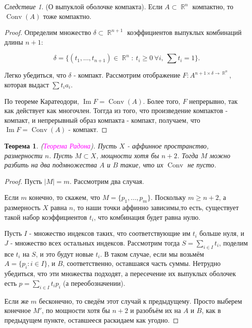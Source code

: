 \documentclass[a4paper,100pt]{article}
\theoremstyle{indented}
\newtheorem{theorem}{Теорема}
\theoremstyle{definition}
\theoremstyle{remark}
\newtheorem{cons}{Следствие}
\DeclareMathOperator{\ra}{\rightarrow}
\DeclareMathOperator{\Imf}{Im}
\DeclareMathOperator{\Conv}{Conv}
\DeclareMathOperator{\RR}{\mathbb{R}}
\begin{document}
\begin{cons}
    (О выпуклой оболочке компакта). Если $A\subset \RR^n$ компактно, то $\Conv(A)$ тоже компактно.
\end{cons}

\begin{proof}
    Определим множество $\delta \subset \RR^{n+1}$ коэффициентов выпуклых комбинаций длины $n+1$:

    \[
        \delta = \{ (t_1, \ldots, t_{n+1} ) \in \RR^n: \: t_i \geq 0 \: \forall i, \: \sum t_i = 1 \}.
    \]

    Легко убедиться, что $\delta$ - компакт. Рассмотрим отображение $F: A^{n+1 \times \delta \ra \RR^n}$, которая выдаст $\sum t_i a_i$. \ 

    По теореме Каратеодори, $\Imf F = \Conv(A)$. Более того, $F$ непрерывно, так как действует как многочлен. Тоггда из того, что произведение компактов - компакт, и непрерывный образ компакта - компакт, получаем, что $\Imf F = \Conv(A)$ - компакт.
\end{proof}

\begin{theorem}
    (\textit{\textcolor{magenta}{\hypertarget{s93}{Теорема Радона}}}). Пусть $X$ - аффинное пространство, размерности $n$. Пусть $M \subset X$, мощности хотя бы $n+2$. Тогда $M$ можно разбить на два подмножества $A$ и $B$ такие, что их $\Conv$ не пусто.
\end{theorem} 

\begin{proof}
    Пусть $|M| = m$. Рассмотрим два случая. \ 

    Если $m$ конечно, то скажем, что $M = \{p_1, \ldots, p_m\}$. Поскольку $m \geq n+2$, а размерность $X$ равна $n$, то наши точки аффинно зависимы,то есть, существует такой набор коэффициентов $t_i$, что комбинация будет равна нулю. \ 

    Пусть $I$ - множество индексов таких, что соответствующие им $t_i$ больше нуля, и $J$ - множество всех остальных индексов. Рассмотрим тогда $S = \sum_{i\in I} t_i$, поделим все $t_i$ на $S$, и это будут новые $t_i$. В таком случае, если мы возьмём $A = \{p_i: i \in I\}$, и $B$, соответственно, оставшаяся часть суммы. Нетрудно убедиться, что эти множества подходят, а пересечение их выпуклых оболочек есть $p= \sum_{i \in I} t_i p_i$ (а переобозначении). \ 

    Если же $m$ бесконечно, то сведём этот случай к предыдущему. Просто выберем конечное $M'$, по мощности хотя бы $n+2$ и разобъём их на $A$ и $B$, как в предыдущем пункте, оставшееся раскидаем как угодно.
\end{proof}
\end{document}
